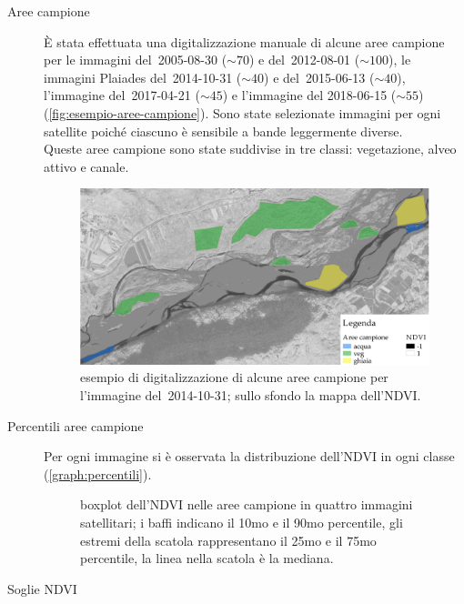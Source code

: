\begin{description}
\begin{equation}
		\label{eq:ndvi}
	\end{equation}
	\item[Aree campione]
	\`{E} stata effettuata una digitalizzazione manuale di alcune aree campione per le immagini \AST{} del~2005-08-30 ($\sim 70$) e del~2012-08-01 ($\sim 100$), le immagini Plaiades del~2014-10-31 ($\sim 40$) e del~2015-06-13 ($\sim 40$), l'immagine \Se{} del~2017-04-21 ($\sim 45$) e l'immagine \WV{} del 2018-06-15 ($\sim 55$) (\vref{fig:esempio-aree-campione}).
	Sono state selezionate immagini per ogni satellite poiché ciascuno è sensibile a bande leggermente diverse. 
	\\
	Queste aree campione sono state suddivise in tre classi: vegetazione, alveo attivo e canale.
	\begin{figure}[ht]
		\centering
		\includegraphics[width=\textwidth]{files/esempio_aree_campione_2014_10_31.jpeg}
		\caption[esempio di aree campione per calcolare la distribuzione dell'NDVI]{esempio di digitalizzazione di alcune aree campione per l'immagine \Pl{} del~2014-10-31; sullo sfondo la mappa dell'NDVI.}
		\label{fig:esempio-aree-campione}
	\end{figure}
	\item[Percentili aree campione]
	Per ogni immagine si è osservata la distribuzione dell'NDVI in ogni classe (\vref{graph:percentili}).
	\begin{figure}[ht]
		\centering
		
		\caption[boxplot dell'NDVI nelle aree campione in quattro immagini satellitari]{boxplot dell'NDVI nelle aree campione in quattro immagini satellitari; i baffi indicano il 10mo e il 90mo percentile, gli estremi della scatola rappresentano il 25mo e il 75mo percentile, la linea nella scatola è la mediana.}
		\label{graph:percentili}
	\end{figure}
	\item[Soglie NDVI] 

\end{description}
